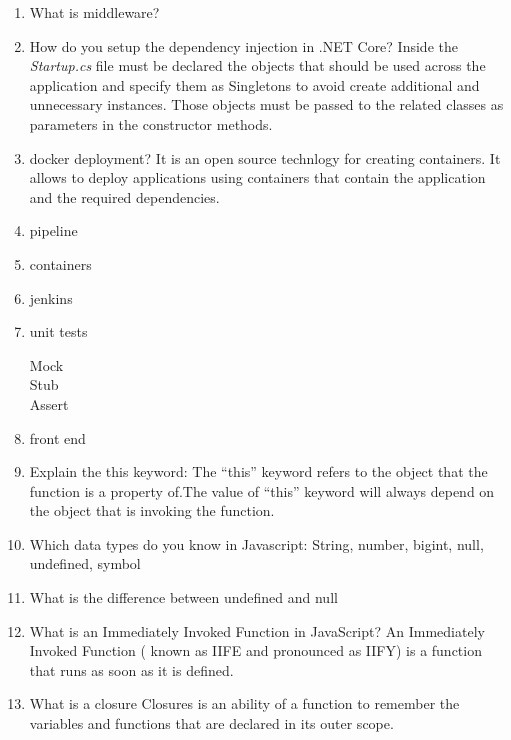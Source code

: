 \begin{multicols}{2}
\begin{enumerate}
\item What is middleware? 

\item How do you setup the dependency injection in .NET Core? Inside the \emph{Startup.cs} file must be declared the objects that should be used across the application and specify them as Singletons to avoid create additional and unnecessary instances. Those objects must be passed to the related classes as parameters in the constructor methods.

\item docker deployment? It is an open source technlogy for creating containers. It allows to deploy applications using containers that contain the application and the required dependencies.

\item pipeline

\item containers

\item jenkins

\item unit tests
\begin{description}
\item[Mock]
\item[Stub]
\item[Assert]
\end{description}

\item front end

\item Explain the this keyword: The “this” keyword refers to the object that the function is a property of.The value of “this” keyword will always depend on the object that is invoking the function.

\item Which data types do you know in Javascript: String, number, bigint, null, undefined, symbol

\item What is the difference between undefined and null

\item What is an Immediately Invoked Function in JavaScript? An Immediately Invoked Function ( known as IIFE and pronounced as IIFY) is a function that runs as soon as it is defined.

\item What is a closure Closures is an ability of a function to remember the variables and functions that are declared in its outer scope.


\end{enumerate}
\end{multicols}
